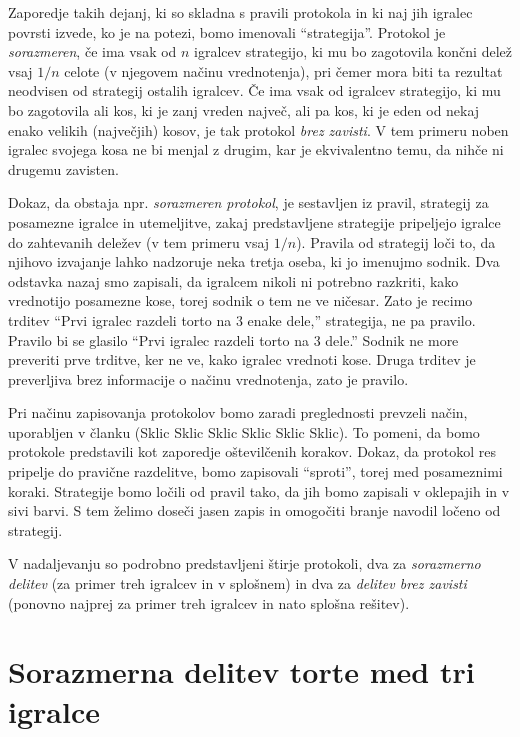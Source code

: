 \documentclass[a4paper,12pt]{article}
\begin{document}
Zaporedje takih dejanj, ki so skladna s pravili protokola in ki naj jih igralec povrsti izvede, ko je na potezi, bomo imenovali ``strategija''. Protokol je {\em sorazmeren}, če ima vsak od $n$ igralcev strategijo, ki mu bo zagotovila končni delež vsaj $1/n$ celote (v njegovem načinu vrednotenja), pri čemer mora biti ta rezultat neodvisen od strategij ostalih igralcev. Če ima vsak od igralcev strategijo, ki mu bo zagotovila ali kos, ki je zanj vreden največ, ali pa kos, ki je eden od nekaj enako velikih (največjih) kosov, je tak protokol {\em brez zavisti}. V tem primeru noben igralec svojega kosa ne bi menjal z drugim, kar je ekvivalentno temu, da nihče ni drugemu zavisten.

Dokaz, da obstaja npr. {\em sorazmeren protokol}, je sestavljen iz pravil, strategij za posamezne igralce in utemeljitve, zakaj predstavljene strategije pripeljejo igralce do zahtevanih deležev (v tem primeru vsaj $1/n$). Pravila od strategij loči to, da njihovo izvajanje lahko nadzoruje neka tretja oseba, ki jo imenujmo sodnik. Dva odstavka nazaj smo zapisali, da igralcem nikoli ni potrebno razkriti, kako vrednotijo posamezne kose, torej sodnik o tem ne ve ničesar. Zato je recimo trditev ``Prvi igralec razdeli torto na 3 enake dele,'' strategija, ne pa pravilo. Pravilo bi se glasilo ``Prvi igralec razdeli torto na 3 dele.'' Sodnik ne more preveriti prve trditve, ker ne ve, kako igralec vrednoti kose. Druga trditev je preverljiva brez informacije o načinu vrednotenja, zato je pravilo.

Pri načinu zapisovanja protokolov bomo zaradi preglednosti prevzeli način, uporabljen v članku (Sklic Sklic Sklic Sklic Sklic Sklic). To pomeni, da bomo protokole predstavili kot zaporedje oštevilčenih korakov. Dokaz, da protokol res pripelje do pravične razdelitve, bomo zapisovali ``sproti'', torej med posameznimi koraki. Strategije bomo ločili od pravil tako, da jih bomo zapisali v oklepajih in v sivi barvi. S tem želimo doseči jasen zapis in omogočiti branje navodil ločeno od strategij.

V nadaljevanju so podrobno predstavljeni štirje protokoli, dva za {\em sorazmerno delitev} (za primer treh igralcev in v splošnem) in dva za {\em delitev brez zavisti} (ponovno najprej za primer treh igralcev in nato splošna rešitev).


\section{Sorazmerna delitev torte med tri igralce}
\end{document}

